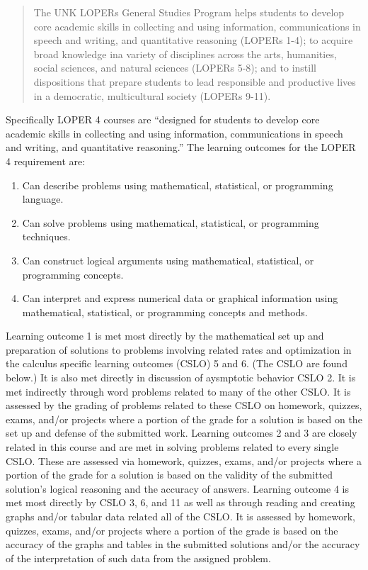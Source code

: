 \documentclass[12pt]{article}
\newcounter{ex}\setcounter{ex}{0}
\begin{document}
\begin{quote}
The UNK LOPERs General Studies Program helps students to develop core academic skills in collecting and using information, communications in speech and writing, and quantitative reasoning (LOPERs 1-4); to acquire broad knowledge ina variety of disciplines across the arts, humanities, social sciences, and natural sciences (LOPERs 5-8); and to instill dispositions that prepare students to lead responsible and productive lives in a democratic, multicultural society (LOPERs 9-11).
\end{quote}

Specifically LOPER 4 courses are ``designed for students to develop core academic skills in collecting and using information, communications in speech and writing, and quantitative reasoning.” The learning outcomes for the LOPER 4 requirement are:
\begin{enumerate}
    \item  Can describe problems using mathematical, statistical, or programming language.

     \item Can solve problems using mathematical, statistical, or programming techniques.

    \item Can construct logical arguments using mathematical, statistical, or programming concepts.

    \item Can interpret and express numerical data or graphical information using mathematical, statistical, or programming concepts and methods.
   \end{enumerate}
   
Learning outcome 1 is met most directly by the mathematical set up and preparation of solutions to problems involving related rates and optimization in the calculus specific learning outcomes (CSLO) 5 and 6. (The CSLO are found below.) It is also met directly in discussion of aysmptotic behavior CSLO 2. It is met indirectly through word problems related to many of the other CSLO. It is assessed by the grading of problems related to these CSLO on homework, quizzes, exams, and/or projects where a portion of the grade for a solution is based on the set up and defense of the submitted work.
Learning outcomes 2 and 3 are closely related in this course and are met in solving problems related to every single CSLO. These are assessed via homework, quizzes, exams, and/or projects where a portion of the grade for a solution is based on the validity of the submitted solution’s logical reasoning and the accuracy of answers.
Learning outcome 4 is met most directly by CSLO 3, 6, and 11 as well as through reading and creating graphs and/or tabular data related all of the CSLO. It is assessed by homework, quizzes, exams, and/or projects where a portion of the grade is based on the accuracy of the graphs and tables in the submitted solutions and/or the accuracy of the interpretation of such data from the assigned problem.
\end{document}
